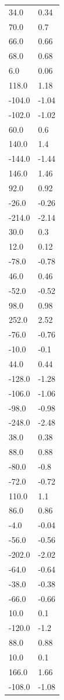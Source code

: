 \begin{longtable}{ll}
34.0 & 0.34 \\
70.0 & 0.7 \\
66.0 & 0.66 \\
68.0 & 0.68 \\
6.0 & 0.06 \\
118.0 & 1.18 \\
-104.0 & -1.04 \\
-102.0 & -1.02 \\
60.0 & 0.6 \\
140.0 & 1.4 \\
-144.0 & -1.44 \\
146.0 & 1.46 \\
92.0 & 0.92 \\
-26.0 & -0.26 \\
-214.0 & -2.14 \\
30.0 & 0.3 \\
12.0 & 0.12 \\
-78.0 & -0.78 \\
46.0 & 0.46 \\
-52.0 & -0.52 \\
98.0 & 0.98 \\
252.0 & 2.52 \\
-76.0 & -0.76 \\
-10.0 & -0.1 \\
44.0 & 0.44 \\
-128.0 & -1.28 \\
-106.0 & -1.06 \\
-98.0 & -0.98 \\
-248.0 & -2.48 \\
38.0 & 0.38 \\
88.0 & 0.88 \\
-80.0 & -0.8 \\
-72.0 & -0.72 \\
110.0 & 1.1 \\
86.0 & 0.86 \\
-4.0 & -0.04 \\
-56.0 & -0.56 \\
-202.0 & -2.02 \\
-64.0 & -0.64 \\
-38.0 & -0.38 \\
-66.0 & -0.66 \\
10.0 & 0.1 \\
-120.0 & -1.2 \\
88.0 & 0.88 \\
10.0 & 0.1 \\
166.0 & 1.66 \\
-108.0 & -1.08 \\

\end{longtable}
